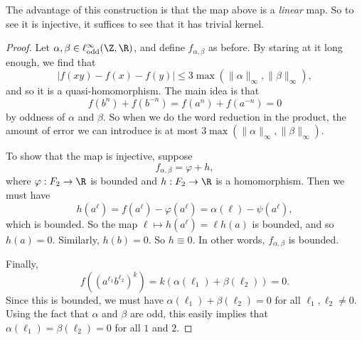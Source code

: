 \documentclass[a4paper]{article}
\newcommand\Free{F}
\begin{document}
The advantage of this construction is that the map above is a \emph{linear} map. So to see it is injective, it suffices to see that it has trivial kernel.
\begin{proof}
  Let $\alpha, \beta \in \ell_{\mathrm{odd}}^\infty (\Z, \R)$, and define $f_{\alpha, \beta}$ as before. By staring at it long enough, we find that
  \[
    |f(xy) - f(x) - f(y)| \leq 3 \max (\|\alpha\|_\infty, \|\beta\|_\infty),
  \]
  and so it is a quasi-homomorphism. The main idea is that
  \[
    f(b^n) + f(b^{-n}) = f(a^n) + f(a^{-n}) = 0
  \]
  by oddness of $\alpha$ and $\beta$. So when we do the word reduction in the product, the amount of error we can introduce is at most $3 \max (\|\alpha\|_\infty, \|\beta\|_\infty)$.

  To show that the map is injective, suppose
  \[
    f_{\alpha, \beta} = \varphi + h,
  \]
  where $\varphi: \Free_2 \to \R$ is bounded and $h: \Free_2 \to \R$ is a homomorphism. Then we must have
  \[
    h(a^\ell) = f(a^\ell) - \varphi(a^\ell) = \alpha(\ell) - \psi(a^\ell),
  \]
  which is bounded. So the map $\ell \mapsto h(a^\ell) = \ell h(a)$ is bounded, and so $h(a) = 0$. Similarly, $h(b) = 0$. So $h \equiv 0$. In other words, $f_{\alpha, \beta}$ is bounded.

  Finally,
  \[
    f((a^{\ell_1} b^{\ell_2})^k) = k (\alpha(\ell_1) + \beta(\ell_2)) = 0.
  \]
  Since this is bounded, we must have $\alpha(\ell_1) + \beta(\ell_2) = 0$ for all $\ell_1, \ell_2 \not= 0$. Using the fact that $\alpha$ and $\beta$ are odd, this easily implies that $\alpha(\ell_1) = \beta(\ell_2) = 0$ for all $1$ and $2$.

%
\end{proof}
\end{document}
